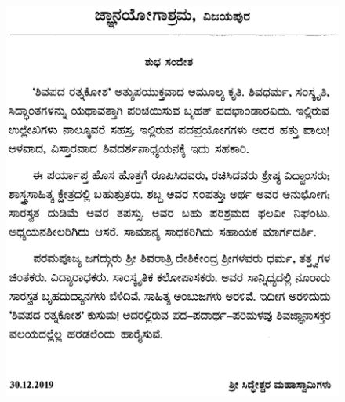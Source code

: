 \begin{figure}[H]
\centering
\includegraphics[scale=.98]{images/002.eps}
\end{figure}

\newpage

\thispagestyle{empty}

